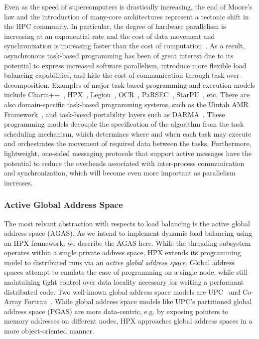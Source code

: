 Even as the speed of supercomputers is drastically increasing, the end of Moore's law and the introduction of many-core architectures represent a tectonic shift in the HPC community.
In particular, the degree of hardware parallelism is increasing at an exponential rate and the cost of data movement and synchronization is increasing faster than the cost of computation~\cite{Kogge2013}.
As a result, asynchronous task-based programming has been of great interest due to its potential to express increased software parallelism, introduce more flexible load balancing capabilities, and hide the cost of communication through task over-decomposition.
Examples of major task-based programming and execution models include Charm++~\cite{charm++}, HPX~\cite{hpx2}, Legion~\cite{legion}, OCR~\cite{ocr}, PaRSEC~\cite{parsec}, StarPU~\cite{starpu}, etc.
There are also domain-specific task-based programming systems, such as the Uintah AMR Framework~\cite{uintah}, and task-based portability layers such as DARMA~\cite{darma}.
These programming models decouple the specification of the algorithm from the task scheduling mechanism, which determines where and when each task may execute and orchestrates the movement of required data between the tasks.
Furthermore, lightweight, one-sided messaging protocols that support active messages have the potential to reduce the overheads associated with inter-process communication and synchronization, which will become even more important as parallelism increases.

\subsubsection{Active Global Address Space}

The most relvant abstraction with respects to load balancing is the active global address space (AGAS). As we intend to implement dynamic load balancing using an HPX framework, we describe the AGAS here.
While the threading subsystem operates within a single private address space, HPX extends its programming model to distributed runs via an \emph{active global address space}. Global address spaces attempt to emulate the ease of programming on a single node, while still maintaining tight control over data locality necessary for writing a performant distributed code. Two well-known global address space models are UPC~\cite{upc} and Co-Array Fortran~\cite{coarray}. While global address space models like UPC's partitioned global address space (PGAS) are more data-centric, e.g. by exposing pointers to memory addresses on different nodes, HPX approaches global address spaces in a more object-oriented manner.

